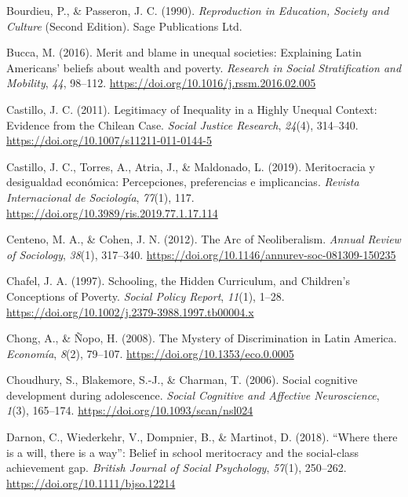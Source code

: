 \documentclass[
  letterpaper,
  DIV=11,
  numbers=noendperiod]{scrartcl}
\newlength{\cslhangindent}
\newlength{\cslentryspacingunit} %
\newenvironment{CSLReferences}[2] %
 {%
  \setlength{\parindent}{0pt}
  \ifodd #1
  \let\oldpar\par
  \def\par{\hangindent=\cslhangindent\oldpar}
  \fi
  \setlength{\parskip}{#2\cslentryspacingunit}
 }%
 {}
\begin{document}
\begin{CSLReferences}{1}{0}
\leavevmode{}%
Bourdieu, P., \& Passeron, J. C. (1990). \emph{Reproduction in
{Education}, {Society} and {Culture}} (Second Edition). Sage
Publications Ltd.

\leavevmode{}%
Bucca, M. (2016). Merit and blame in unequal societies: {Explaining
Latin Americans}' beliefs about wealth and poverty. \emph{Research in
Social Stratification and Mobility}, \emph{44}, 98--112.
\url{https://doi.org/10.1016/j.rssm.2016.02.005}

\leavevmode{}%
Castillo, J. C. (2011). Legitimacy of {Inequality} in a {Highly Unequal
Context}: {Evidence} from the {Chilean Case}. \emph{Social Justice
Research}, \emph{24}(4), 314--340.
\url{https://doi.org/10.1007/s11211-011-0144-5}

\leavevmode{}%
Castillo, J. C., Torres, A., Atria, J., \& Maldonado, L. (2019).
Meritocracia y desigualdad econ{ó}mica: {Percepciones}, preferencias e
implicancias. \emph{Revista Internacional de Sociolog{í}a},
\emph{77}(1), 117. \url{https://doi.org/10.3989/ris.2019.77.1.17.114}

\leavevmode{}%
Centeno, M. A., \& Cohen, J. N. (2012). The {Arc} of {Neoliberalism}.
\emph{Annual Review of Sociology}, \emph{38}(1), 317--340.
\url{https://doi.org/10.1146/annurev-soc-081309-150235}

\leavevmode{}%
Chafel, J. A. (1997). Schooling, the {Hidden Curriculum}, and
{Children}'s {Conceptions} of {Poverty}. \emph{Social Policy Report},
\emph{11}(1), 1--28.
\url{https://doi.org/10.1002/j.2379-3988.1997.tb00004.x}

\leavevmode{}%
Chong, A., \& Ñopo, H. (2008). The {Mystery} of {Discrimination} in
{Latin America}. \emph{Econom{í}a}, \emph{8}(2), 79--107.
\url{https://doi.org/10.1353/eco.0.0005}

\leavevmode{}%
Choudhury, S., Blakemore, S.-J., \& Charman, T. (2006). Social cognitive
development during adolescence. \emph{Social Cognitive and Affective
Neuroscience}, \emph{1}(3), 165--174.
\url{https://doi.org/10.1093/scan/nsl024}

\leavevmode{}%
Darnon, C., Wiederkehr, V., Dompnier, B., \& Martinot, D. (2018).
{``{Where} there is a will, there is a way''}: {Belief} in school
meritocracy and the social-class achievement gap. \emph{British Journal
of Social Psychology}, \emph{57}(1), 250--262.
\url{https://doi.org/10.1111/bjso.12214}


\end{CSLReferences}
\end{document}
